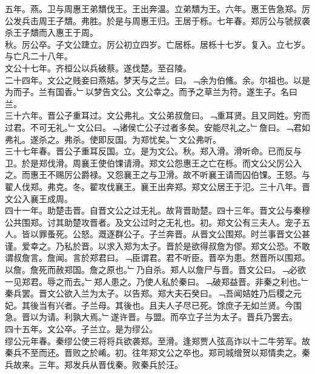\documentclass{zhvt-classic}
\begin{document}
\hspace*{2em}五年。燕。卫与周惠王弟穨伐王。王出奔温。立弟穨为王。六年。惠王告急郑。厉公发兵击周王子穨。弗胜。於是与周惠王归。王居于栎。七年春。郑厉公与虢叔袭杀王子穨而入惠王于周。\\
\hspace*{2em}秋。厉公卒。子文公踕立。厉公初立四岁。亡居栎。居栎十七岁。复入。立七岁。与亡凡二十八年。\\
\hspace*{2em}文公十七年。齐桓公以兵破蔡。遂伐楚。至召陵。\\
\hspace*{2em}二十四年。文公之贱妾曰燕姞。梦天与之兰。曰。﹁余为伯鯈。余。尔祖也。以是为而子。兰有国香。﹂以梦告文公。文公幸之。而予之草兰为符。遂生子。名曰兰。\\
\hspace*{2em}三十六年。晋公子重耳过。文公弗礼。文公弟叔詹曰。﹁重耳贤。且又同姓。穷而过君。不可无礼。﹂文公曰。﹁诸侯亡公子过者多矣。安能尽礼之。﹂詹曰。﹁君如弗礼。遂杀之。弗杀。使即反国。为郑忧矣。﹂文公弗听。\\
\hspace*{2em}三十七年春。晋公子重耳反国。立。是为文公。秋。郑入滑。滑听命。已而反与卫。於是郑伐滑。周襄王使伯馃请滑。郑文公怨惠王之亡在栎。而文公父厉公入之。而惠王不赐厉公爵禄。又怨襄王之与卫滑。故不听襄王请而囚伯馃。王怒。与翟人伐郑。弗克。冬。翟攻伐襄王。襄王出奔郑。郑文公居王于氾。三十八年。晋文公入襄王成周。\\
\hspace*{2em}四十一年。助楚击晋。自晋文公之过无礼。故背晋助楚。四十三年。晋文公与秦穆公共围郑。讨其助楚攻晋者。及文公过时之无礼也。初。郑文公有三夫人。宠子五人。皆以罪蚤死。公怒。溉逐群公子。子兰奔晋。从晋文公围郑。时兰事晋文公甚谨。爱幸之。乃私於晋。以求入郑为太子。晋於是欲得叔詹为僇。郑文公恐。不敢谓叔詹言。詹闻。言於郑君曰。﹁臣谓君。君不听臣。晋卒为患。然晋所以围郑。以詹。詹死而赦郑国。詹之原也。﹂乃自杀。郑人以詹尸与晋。晋文公曰。﹁必欲一见郑君。辱之而去。﹂郑人患之。乃使人私於秦曰。﹁破郑益晋。非秦之利也。﹂秦兵罢。晋文公欲入兰为太子。以告郑。郑大夫石癸曰。﹁吾闻姞姓乃后稷之元妃。其後当有兴者。子兰母。其後也。且夫人子尽已死。馀庶子无如兰贤。今围急。晋以为请。利孰大焉。﹂遂许晋。与盟。而卒立子兰为太子。晋兵乃罢去。\\
\hspace*{2em}四十五年。文公卒。子兰立。是为缪公。\\
\hspace*{2em}缪公元年春。秦缪公使三将将兵欲袭郑。至滑。逢郑贾人弦高诈以十二牛劳军。故秦兵不至而还。晋败之於崤。初。往年郑文公之卒也。郑司城缯贺以郑情卖之。秦兵故来。三年。郑发兵从晋伐秦。败秦兵於汪。\\
\end{document}
